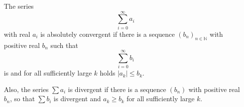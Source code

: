 \documentclass[12pt]{article}
\begin{document}
The series
$$\sum_{i=0}^\infty a_i$$
with real $a_i$ is absolutely convergent if there is a sequence $(b_n)_{n\in\mathbb{N}}$ with positive real $b_n$ such that
$$\sum_{i=0}^\infty b_i$$
is  and for all sufficiently large $k$ holds $|a_k|\leq b_k$.

Also, the series $\sum a_i$ is divergent if there is a sequence $(b_n)$ with positive real $b_n$, so that $\sum b_i$ is divergent and $a_k\geq b_k$ for all sufficiently large $k$.
\end{document}
